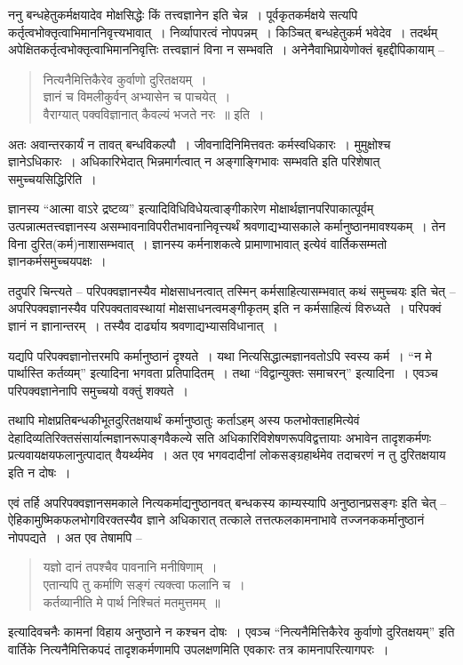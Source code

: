 {ननु बन्धहेतुकर्मक्षयादेव मोक्षसिद्धेः किं तत्त्वज्ञानेन इति चेन्न~। पूर्वकृतकर्मक्षये सत्यपि कर्तृत्वभोक्तृत्वाभिमाननिवृत्त्यभावात्~। निर्व्यापारत्वं नोपपन्नम्~। किञ्चित् बन्धहेतुकर्म भवेदेव~। तदर्थम् अपेक्षितकर्तृत्वभोक्तृत्वाभिमाननिवृत्तिः तत्त्वज्ञानं विना न सम्भवति~। अनेनैवाभिप्रायेणोक्तं बृहद्दीपिकायाम् –
\begin{verse}
नित्यनैमित्तिकैरेव कुर्वाणो दुरितक्षयम्~। \\
ज्ञानं च विमलीकुर्वन् अभ्यासेन च पाचयेत्~। \\
वैराग्यात् पक्वविज्ञानात् कैवल्यं भजते नरः~॥ इति~। 
\end{verse}
अतः अवान्तरकार्यं न तावत् बन्धविकल्पौ~। जीवनादिनिमित्तवतः कर्मस्वधिकारः~। मुमुक्षोश्च ज्ञानेऽधिकारः~। अधिकारिभेदात् भिन्नमार्गत्वात् न अङ्गाङ्गिभावः सम्भवति इति परिशेषात् समुच्चयसिद्धिरिति~। 

ज्ञानस्य “आत्मा वाऽरे द्रष्टव्य” इत्यादिविधिविधेयत्वाङ्गीकारेण मोक्षार्थज्ञानपरिपाकात्पूर्वम् उत्पन्नात्मतत्त्वज्ञानस्य असम्भावनाविपरीतभावनानिवृत्त्यर्थं श्रवणाद्यभ्यासकाले कर्मानुष्ठानमावश्यकम्~। तेन विना दुरित(कर्म)नाशासम्भवात्~। ज्ञानस्य कर्मनाशकत्वे प्रामाणाभावात् इत्येवं वार्तिकसम्मतो ज्ञानकर्मसमुच्चयपक्षः~। 

तदुपरि चिन्त्यते – परिपक्वज्ञानस्यैव मोक्षसाधनत्वात् तस्मिन् कर्मसाहित्यासम्भवात् कथं समुच्चयः इति चेत् – अपरिपक्वज्ञानस्यैव परिपक्वतावस्थायां मोक्षसाधनत्वमङ्गीकृतम् इति न कर्मसाहित्यं विरुध्यते~। परिपक्वं ज्ञानं न ज्ञानान्तरम्~। तस्यैव दार्ढ्याय श्रवणाद्यभ्यासविधानात्~। 

यद्यपि परिपक्वज्ञानोत्तरमपि कर्मानुष्ठानं दृश्यते~। यथा नित्यसिद्धात्मज्ञानवतोऽपि स्वस्य कर्म~। “न मे पार्थास्ति कर्तव्यम्” इत्यादिना भगवता प्रतिपादितम्~। तथा “विद्वान्युक्तः समाचरन्” इत्यादिना~। एवञ्च परिपक्वज्ञानेनापि समुच्चयो वक्तुं शक्यते~। 

तथापि मोक्षप्रतिबन्धकीभूतदुरितक्षयार्थं कर्मानुष्ठातुः कर्ताऽहम् अस्य फलभोक्ताहमित्येवं देहादिव्यतिरिक्तसंसार्यात्मज्ञानरूपाङ्गवैकल्ये सति अधिकारिविशेषणरूपविद्वत्तायाः अभावेन तादृशकर्मणः प्रत्यवायक्षयफलानुत्पादात् वैयर्थ्यमेव~। अत एव भगवदादीनां लोकसङ्ग्रहार्थमेव तदाचरणं न तु दुरितक्षयाय इति न दोषः~। 

एवं तर्हि अपरिपक्वज्ञानसमकाले नित्यकर्माद्यनुष्ठानवत् बन्धकस्य काम्यस्यापि अनुष्ठानप्रसङ्गः इति चेत् – ऐहिकामुष्मिकफलभोगविरक्तस्यैव ज्ञाने अधिकारात् तत्काले तत्तत्फलकामनाभावे तज्जनककर्मानुष्ठानं नोपपद्यते~। अत एव तेषामपि –
\begin{verse}
यज्ञो दानं तपश्चैव पावनानि मनीषिणाम्~। \\
एतान्यपि तु कर्माणि सङ्गं त्यक्त्वा फलानि च~। \\
कर्तव्यानीति मे पार्थ निश्चितं मतमुत्तमम्~॥
\end{verse}
इत्यादिवचनैः कामनां विहाय अनुष्ठाने न कश्चन दोषः~। एवञ्च “नित्यनैमित्तिकैरेव कुर्वाणो दुरितक्षयम्” इति वार्तिके नित्यनैमित्तिकपदं तादृशकर्मणामपि उपलक्षणमिति एवकारः तत्र कामनापरित्यागपरः~। 

}
